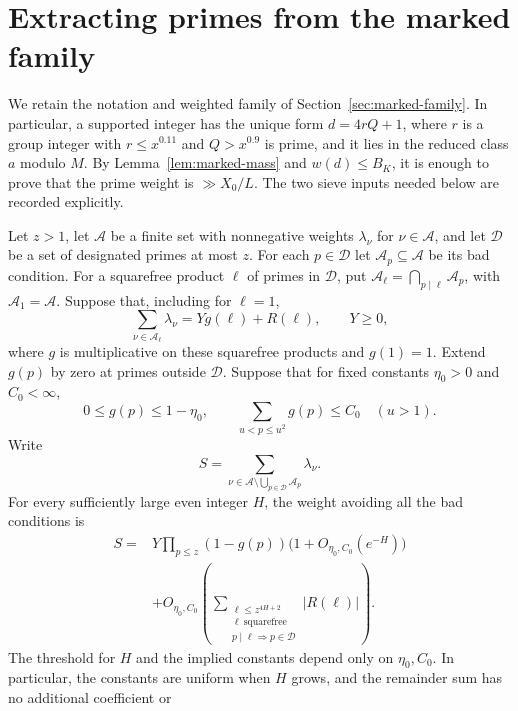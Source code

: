 \section{Extracting primes from the marked family}\label{sec:prime-reservoir}

We retain the notation and weighted family of
Section~\ref{sec:marked-family}.  In particular, a supported integer has
the unique form $d=4rQ+1$, where $r$ is a group integer with
$r\le x^{0.11}$ and $Q>x^{0.9}$ is prime, and it lies in the reduced
class $a$ modulo $M$.  By Lemma~\ref{lem:marked-mass} and $w(d)\le B_K$,
it is enough to prove that the prime weight is $\gg X_0/L$.
The two sieve inputs needed below are recorded explicitly.

\begin{hypothesis}\label{input:block}
Let $z>1$, let $\mathcal A$ be a finite set with nonnegative weights
$\lambda_\nu$ for $\nu\in\mathcal A$, and let $\mathcal D$ be a set of
designated primes at most $z$.  For each $p\in\mathcal D$ let
$\mathcal A_p\subseteq\mathcal A$ be its bad condition.  For a squarefree
product $\ell$ of primes in $\mathcal D$, put
$\mathcal A_\ell=\bigcap_{p\mid\ell}\mathcal A_p$, with
$\mathcal A_1=\mathcal A$.  Suppose that, including for $\ell=1$,
\[
 \sum_{\nu\in\mathcal A_\ell}\lambda_\nu=Yg(\ell)+R(\ell),
 \qquad Y\ge0,
\]
where $g$ is multiplicative on these squarefree products and $g(1)=1$.
Extend $g(p)$ by zero at primes outside $\mathcal D$.  Suppose that for
fixed constants $\eta_0>0$ and $C_0<\infty$,
\[
 0\le g(p)\le1-\eta_0,
 \qquad
 \sum_{u<p\le u^2}g(p)\le C_0\quad(u>1).
\]
Write
\[
 S=\sum_{\nu\in\mathcal A\setminus\bigcup_{p\in\mathcal D}\mathcal A_p}
       \lambda_\nu.
\]
For every sufficiently large even integer $H$, the weight avoiding all
the bad conditions is
\begin{equation}\label{eq:block-sieve}
 \begin{split}
 S={}&Y\prod_{p\le z}(1-g(p))\bigl(1+O_{\eta_0,C_0}(e^{-H})\bigr)\\
 &+O_{\eta_0,C_0}\left(
    \sum_{\substack{\ell\le z^{4H+2}\\
                    \ell\ \mathrm{squarefree}\\
                    p\mid\ell\Rightarrow p\in\mathcal D}}
       |R(\ell)|\right).
 \end{split}
\end{equation}
The threshold for $H$ and the implied constants depend
only on $\eta_0,C_0$.  In particular, the constants are uniform when
$H$ grows, and the remainder sum has no additional coefficient or

\end{hypothesis}
